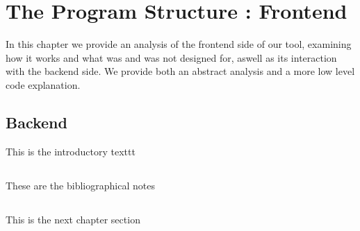 %
%

\chapter{The Program Structure : Frontend}


\begin{resumen}
In this chapter we provide an analysis of the frontend side of our tool, examining how it works and what was and was not designed for, aswell as its interaction with the backend side.
We provide both an abstract analysis and a more low level code explanation.
\end{resumen}


\section{Backend}
\label{cap1:sec:introduccion}

This is the introductory texttt

\section*{\NotasBibliograficas}
\TocNotasBibliograficas

These are the bibliographical notes
\citep{ldesc2e}

\medskip



\section*{\ProximoCapitulo}
\TocProximoCapitulo

This is the next chapter section

